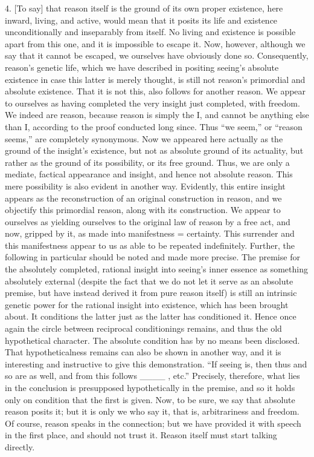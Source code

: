 4. [To say] that reason itself is
the ground of its own proper existence,
here inward, living, and active,
would mean that it posits its life and existence
unconditionally and inseparably from itself.
No living and existence is possible apart from this one,
and it is impossible to escape it.
Now, however, although we say that it cannot be escaped,
we ourselves have obviously done so.
Consequently, reason's genetic life,
which we have described in
positing seeing's absolute existence
in case this latter is merely thought,
is still not reason's primordial
and absolute existence.
That it is not this,
also follows for another reason.
We appear to ourselves as
having completed the very insight
just completed, with freedom.
We indeed are reason,
because reason is simply the I,
and cannot be anything else than I,
according to the proof conducted long since.
Thus “we seem,” or “reason seems,”
are completely synonymous.
Now we appeared here actually as
the ground of the insight's existence,
but not as absolute ground of its actuality,
but rather as the ground of its possibility,
or its free ground.
Thus, we are only a mediate,
factical appearance and insight,
and hence not absolute reason.
This mere possibility is
also evident in another way.
Evidently, this entire insight appears as
the reconstruction of an original construction in reason,
and we objectify this primordial reason,
along with its construction.
We appear to ourselves as yielding ourselves
to the original law of reason by a free act,
and now, gripped by it, as made into manifestness = certainty.
This surrender and this manifestness appear to us
as able to be repeated indefinitely.
Further, the following in particular
should be noted and made more precise.
The premise for the absolutely completed,
rational insight into seeing's inner essence
as something absolutely external
(despite the fact that we do not
let it serve as an absolute premise,
but have instead derived it from pure reason itself)
is still an intrinsic genetic power
for the rational insight into existence,
which has been brought about.
It conditions the latter just as
the latter has conditioned it.
Hence once again the circle
between reciprocal conditionings remains,
and thus the old hypothetical character.
The absolute condition has by no means been disclosed.
That hypotheticalness remains can also be shown in another way,
and it is interesting and instructive to give this demonstration.
“If seeing is, then thus and so are as well,
and from this follows ____ , etc.”
Precisely, therefore, what lies in the conclusion is
presupposed hypothetically in the premise,
and so it holds only on condition that the first is given.
Now, to be sure, we say that absolute reason posits it;
but it is only we who say it, that is, arbitrariness and freedom.
Of course, reason speaks in the connection;
but we have provided it with speech in the first place,
and should not trust it.
Reason itself must start talking directly.

